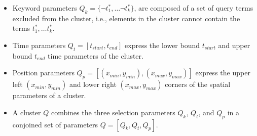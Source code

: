 \begin{itemize}
\item Keyword parameters $Q_k=\{\neg t_{1}^{*},\dots \neg t_{k}^{*}\}$, are composed of a set of query terms excluded from the cluster, i.e., elements in the cluster cannot contain the terms $t_{1}^{*},\dots t_{k}^{*}$.
\item Time parameters $Q_t=[t_{start},t_{end}]$ express the lower bound $t_{start}$ and upper bound $t_{end}$ time parameters of the cluster.
\item Position parameters $Q_p=[(x_{min},y_{min}),(x_{max},y_{max})]$ express the upper left $(x_{min},y_{min})$ and lower right $(x_{max},y_{max})$ corners of the spatial parameters of a cluster.%
\item A cluster $Q$ combines the three selection parameters $Q_k$, $Q_t$, and $Q_p$ in a conjoined set of parameters 
$Q=[Q_k, Q_t, Q_p]$. 

\end{itemize}










